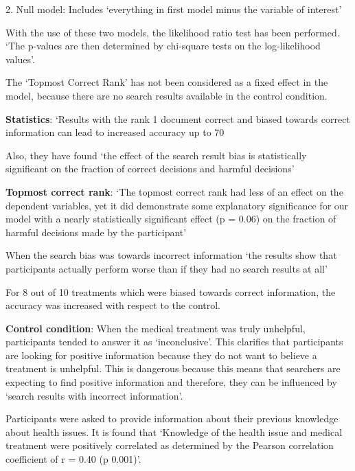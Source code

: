 \documentclass[]{article}
\begin{document}
2.	Null model: Includes ‘everything in first model minus the variable of interest’

With the use of these two models, the likelihood ratio test has been performed. ‘The p-values are then determined by chi-square tests on the log-likelihood values’.

The ‘Topmost Correct Rank’ has not been considered as a fixed effect in the model, because there are no search results available in the control condition. 

\textbf{Statistics}: ‘Results with the rank 1 document correct and biased towards correct information can lead to increased accuracy up to 70%

Also, they have found ‘the effect of the search result bias is statistically significant on the fraction of correct decisions and harmful decisions’

\textbf{Topmost correct rank}: ‘The topmost correct rank had less of an effect on the dependent variables, yet it did demonstrate some explanatory significance for our model with a nearly statistically significant effect (p = 0.06) on the fraction of harmful decisions made by the participant’

When the search bias was towards incorrect information ‘the results show that participants actually perform worse than if they had no search results at all’

For 8 out of 10 treatments which were biased towards correct information, the accuracy was increased with respect to the control. 

\textbf{Control condition}: When the medical treatment was truly unhelpful, participants tended to answer it as ‘inconclusive’. This clarifies that participants are looking for positive information because they do not want to believe a treatment is unhelpful. This is dangerous because this means that searchers are expecting to find positive information and therefore, they can be influenced by ‘search results with incorrect information’. 

Participants were asked to provide information about their previous knowledge about health issues. It is found that ‘Knowledge of the health issue and medical treatment were positively correlated as determined by the Pearson correlation coefficient of r = 0.40 (p 0.001)’.
 
\end{document}
